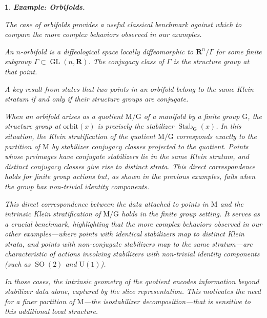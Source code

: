 \documentclass[10pt,reqno,letterpaper,twoside]{amsart}
\theoremstyle{article}
\newtheorem{article}{}
\def\artlabel[#1]{\textbf{#1.}}
\newcommand{\RR}{\mathbf{R}}
\def \G{\mathrm G}
\def \M{\mathrm M}
\def \U{\mathrm U}
\DeclareMathOperator{\GL}{GL}
\DeclareMathOperator{\SO}{SO}
\DeclareMathOperator{\Stab}{Stab}
\newcommand{\orbit}{{\mathrm{orbit}}}
\begin{document}
  \begin{article}
    \artlabel[Example: Orbifolds]
    \label{ExampleOrbifolds}
    
    The case of orbifolds provides a useful classical benchmark against which to compare the more complex behaviors observed in our examples.
    
    An $n$-orbifold is a diffeological space locally diffeomorphic to $\RR^n/\Gamma$ for some finite subgroup $\Gamma \subset \GL(n,\RR)$.
    The conjugacy class of $\Gamma$ is the structure group at that point.
    
    A key result from \cite[Lemma 26]{IKZ10} states that two points in an orbifold belong to the same Klein stratum if and only if their structure groups are conjugate.
    
    
    When an orbifold arises as a quotient $\M/\G$ of a manifold by a finite group $\G$,
    the structure group at $\orbit(x)$ is precisely the stabilizer $\Stab_\G(x)$.
    In this situation,
    the Klein stratification of the quotient $\M/\G$ corresponds exactly to the partition of $\M$ by stabilizer conjugacy classes projected to the quotient.
    Points whose preimages have conjugate stabilizers lie in the same Klein stratum,
    and distinct conjugacy classes give rise to distinct strata.
    This direct correspondence holds for finite group actions but,
    as shown in the previous examples,
    fails when the group has non-trivial identity components.
    
    This direct correspondence between the data attached to points in $\M$ and the intrinsic Klein stratification of $\M/\G$ holds in the finite group setting.
    It serves as a crucial benchmark,
    highlighting that the more complex behaviors observed in our other examples—where points with identical stabilizers map to distinct Klein strata,
    and points with non-conjugate stabilizers map to the same stratum—are characteristic of actions involving stabilizers with non-trivial identity components (such as $\SO(2)$ and $\U(1)$).
    
    In those cases,
    the intrinsic geometry of the quotient encodes information beyond stabilizer data alone,
    captured by the slice representation.
    This motivates the need for a finer partition of $\M$—the isostabilizer decomposition—that is sensitive to this additional local structure.
  \end{article}
  
  
\end{document}
